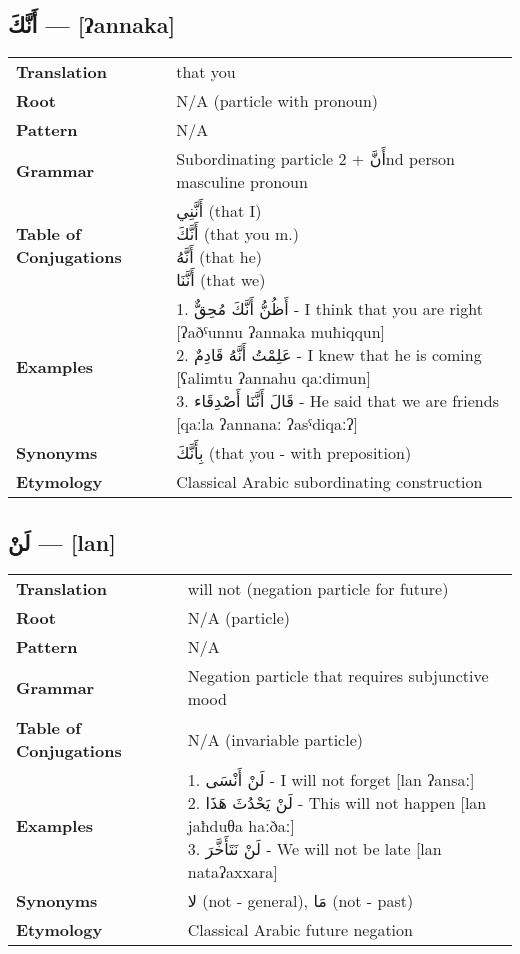 \documentclass[a4paper,12pt]{article}
\begin{document}
\subsection{\textarabic{أَنَّكَ} — [ʔannaka]}
\begin{tabular}{p{3cm}p{10cm}}
\toprule
\textbf{Translation} & that you \\
\textbf{Root} & N/A (particle with pronoun) \\
\textbf{Pattern} & N/A \\
\textbf{Grammar} & Subordinating particle 2 + \textarabic{أَنَّ}nd person masculine pronoun \\
\textbf{Table of Conjugations} & \makecell[l]{
\textarabic{أَنَّنِي} (that I)\\
\textarabic{أَنَّكَ} (that you m.)\\
\textarabic{أَنَّهُ} (that he)\\
\textarabic{أَنَّنَا} (that we)
} \\
\textbf{Examples} & \makecell[l]{\parbox{9.5cm}{
1. \textarabic{أَظُنُّ أَنَّكَ مُحِقٌّ} - I think that you are right [ʔaðˤunnu ʔannaka muħiqqun]\\
2. \textarabic{عَلِمْتُ أَنَّهُ قَادِمٌ} - I knew that he is coming [ʕalimtu ʔannahu qaːdimun]\\
3. \textarabic{قَالَ أَنَّنَا أَصْدِقَاء} - He said that we are friends [qaːla ʔannanaː ʔasˤdiqaːʔ]
}} \\
\midrule

\textbf{Synonyms} & \textarabic{بِأَنَّكَ} (that you - with preposition) \\
\textbf{Etymology} & Classical Arabic subordinating construction \\
\bottomrule
\end{tabular}

\subsection{\textarabic{لَنْ} — [lan]}
\begin{tabular}{p{3cm}p{10cm}}
\toprule
\textbf{Translation} & will not (negation particle for future) \\
\textbf{Root} & N/A (particle) \\
\textbf{Pattern} & N/A \\
\textbf{Grammar} & Negation particle that requires subjunctive mood \\
\textbf{Table of Conjugations} & N/A (invariable particle) \\
\textbf{Examples} & \makecell[l]{\parbox{9.5cm}{
1. \textarabic{لَنْ أَنْسَى} - I will not forget [lan ʔansaː]\\
2. \textarabic{لَنْ يَحْدُثَ هَذَا} - This will not happen [lan jaħduθa haːðaː]\\
3. \textarabic{لَنْ نَتَأَخَّرَ} - We will not be late [lan nataʔaxxara]
}} \\
\midrule
\textbf{Synonyms} & \textarabic{لا} (not - general), \textarabic{مَا} (not - past) \\
\textbf{Etymology} & Classical Arabic future negation \\
\bottomrule
\end{tabular}
\end{document}

